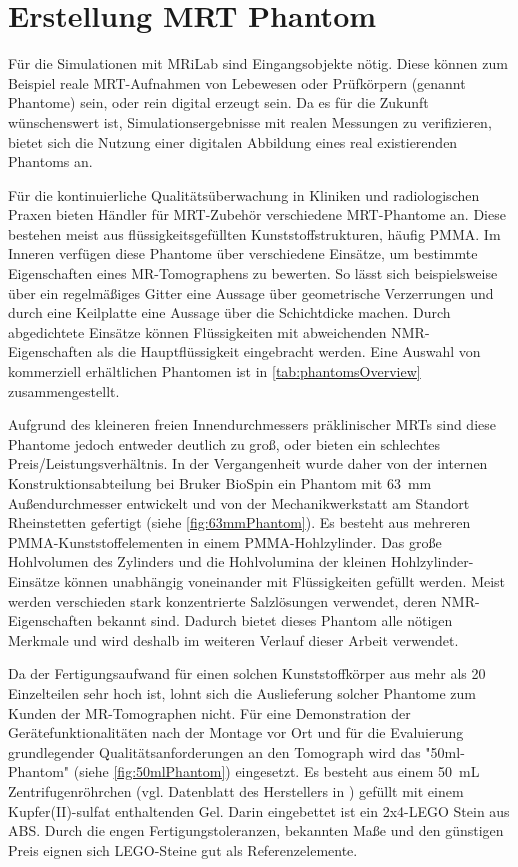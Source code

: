 \section{Erstellung MRT Phantom}
Für die Simulationen mit MRiLab sind Eingangsobjekte nötig. Diese können zum Beispiel reale MRT-Aufnahmen von Lebewesen oder Prüfkörpern (genannt Phantome) sein, oder rein digital erzeugt sein. Da es für die Zukunft wünschenswert ist, Simulationsergebnisse mit realen Messungen zu verifizieren, bietet sich die Nutzung einer digitalen Abbildung eines real existierenden Phantoms an.

Für die kontinuierliche Qualitätsüberwachung in Kliniken und radiologischen Praxen bieten Händler für MRT-Zubehör verschiedene MRT-Phantome an. Diese bestehen meist aus flüssigkeitsgefüllten Kunststoffstrukturen, häufig PMMA. Im Inneren verfügen diese Phantome über verschiedene Einsätze, um bestimmte Eigenschaften eines MR-Tomographens zu bewerten. So lässt sich beispielsweise über ein regelmäßiges Gitter eine Aussage über geometrische Verzerrungen und durch eine Keilplatte eine Aussage über die Schichtdicke machen. Durch abgedichtete Einsätze können Flüssigkeiten mit abweichenden NMR-Eigenschaften als die Hauptflüssigkeit eingebracht werden. Eine Auswahl von kommerziell erhältlichen Phantomen ist in \autoref{tab:phantomsOverview} zusammengestellt.

Aufgrund des kleineren freien Innendurchmessers präklinischer MRTs sind diese Phantome jedoch entweder deutlich zu groß, oder bieten ein schlechtes Preis/Leistungsverhältnis. In der Vergangenheit wurde daher von der internen Konstruktionsabteilung bei Bruker BioSpin ein Phantom mit \SI{63}{\mm} Außendurchmesser entwickelt und von der Mechanikwerkstatt am Standort Rheinstetten gefertigt (siehe \autoref{fig:63mmPhantom}). Es besteht aus mehreren PMMA-Kunststoffelementen in einem PMMA-Hohlzylinder. Das große Hohlvolumen des Zylinders und die Hohlvolumina der kleinen Hohlzylinder-Einsätze können unabhängig voneinander mit Flüssigkeiten gefüllt werden. Meist werden verschieden stark konzentrierte Salzlösungen verwendet, deren NMR-Eigenschaften bekannt sind. Dadurch bietet dieses Phantom alle nötigen Merkmale und wird deshalb im weiteren Verlauf dieser Arbeit verwendet.

 Da der Fertigungsaufwand für einen solchen Kunststoffkörper aus mehr als 20 Einzelteilen sehr hoch ist, lohnt sich die Auslieferung solcher Phantome zum Kunden der MR-Tomographen nicht. Für eine Demonstration der Gerätefunktionalitäten nach der Montage vor Ort und für die Evaluierung grundlegender Qualitätsanforderungen an den Tomograph wird das "50ml-Phantom" (siehe \autoref{fig:50mlPhantom}) eingesetzt. Es besteht aus einem \SI{50}{\milli\liter} Zentrifugenröhrchen (vgl. Datenblatt des Herstellers in \cite{corningCentriStar}) gefüllt mit einem Kupfer(II)-sulfat enthaltenden Gel. Darin eingebettet ist ein 2x4-LEGO Stein aus ABS. Durch die engen Fertigungstoleranzen, bekannten Maße und den günstigen Preis eignen sich LEGO-Steine gut als Referenzelemente.

